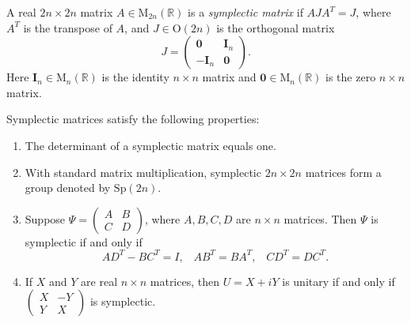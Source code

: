 \documentclass[12pt]{article}
\begin{document}
\newcommand{\mm}{\mathrm{M}}
\newcommand{\oo}{\mathrm{O}}
\newcommand{\R}{\mathbb{R}}
\newcommand{\I}{\mathbf{I}}

A real $2n\times 2n$ matrix $A\in\mm_{2n}(\R)$ is a \emph{symplectic matrix}
if $A J A^T = J$, where $A^T$ is the transpose of $A$, and 
$J\in\oo(2n)$ is the orthogonal matrix
$$J=\left( \begin{array}{cc}
\mathbf 0 & \I_n \\
-\I_n & \mathbf 0
\end{array} \right).$$ 
Here $\I_n\in\mm_n(\R)$ is the identity $n\times n$ matrix and 
$\mathbf 0\in\mm_n(\R)$ is the zero $n\times n$ matrix.

Symplectic matrices satisfy the following
properties:
\begin{enumerate}
\item The determinant of a symplectic matrix equals one.
\item With standard matrix multiplication, symplectic $2n\times 2n$ 
matrices form a group denoted by $\mathrm{Sp}(2n)$.
\item Suppose $\Psi=\begin{pmatrix} A&B \\ C & D \end{pmatrix}$,
where $A,B,C,D$ are $n\times n$ matrices. Then
$\Psi$ is symplectic if and only if
$$A D^T - BC^T = I, \,\,\,\,\, AB^T=BA^T, \,\,\,\,\, CD^T=DC^T.$$
\item If $X$ and $Y$ are real $n\times n$ matrices, then
$U=X+iY$ is unitary if and only if
$\begin{pmatrix} X & -Y \\ Y & X \end{pmatrix}$ is symplectic.
\end{enumerate}
\end{document}
